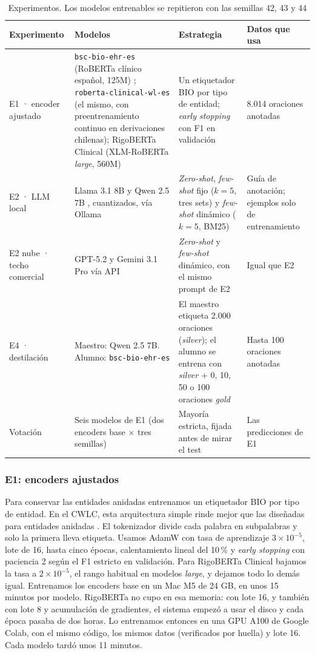 \documentclass[10pt,journal,a4paper]{IEEEtran}
\begin{document}
\begin{table}[!t]
\centering
\caption{Experimentos. Los modelos entrenables se repitieron con las semillas 42, 43 y 44}
\label{tab:diseno}
\begin{tabular}{p{2.1cm}p{5.6cm}p{4.6cm}p{3.6cm}}
\toprule
Experimento & Modelos & Estrategia & Datos que usa \\
\midrule
E1 · encoder ajustado & \texttt{bsc-bio-ehr-es} (RoBERTa clínico español, 125M) \cite{carrino2022}; \texttt{roberta-clinical-wl-es} (el mismo, con preentrenamiento continuo en derivaciones chilenas); RigoBERTa Clinical (XLM-RoBERTa \emph{large}, 560M) \cite{subies2025} & Un etiquetador BIO por tipo de entidad; \emph{early stopping} con F1 en validación & 8.014 oraciones anotadas \\
E2 · LLM local & Llama 3.1 8B \cite{llama3} y Qwen 2.5 7B \cite{qwen25}, cuantizados, vía Ollama & \emph{Zero-shot}, \emph{few-shot} fijo ($k=5$, tres sets) y \emph{few-shot} dinámico ($k=5$, BM25) & Guía de anotación; ejemplos solo de entrenamiento \\
E2 nube · techo comercial & GPT-5.2 \cite{openai2025} y Gemini 3.1 Pro \cite{gemini2026} vía API & \emph{Zero-shot} y \emph{few-shot} dinámico, con el mismo prompt de E2 & Igual que E2 \\
E4 · destilación & Maestro: Qwen 2.5 7B. Alumno: \texttt{bsc-bio-ehr-es} & El maestro etiqueta 2.000 oraciones (\emph{silver}); el alumno se entrena con \emph{silver} + 0, 10, 50 o 100 oraciones \emph{gold} & Hasta 100 oraciones anotadas \\
Votación & Seis modelos de E1 (dos encoders base $\times$ tres semillas) & Mayoría estricta, fijada antes de mirar el test & Las predicciones de E1 \\
\bottomrule
\end{tabular}
\end{table}

\subsubsection{E1: encoders ajustados}
Para conservar las entidades anidadas entrenamos un etiquetador BIO por tipo de entidad. En el CWLC, esta arquitectura simple rinde mejor que las diseñadas para entidades anidadas \cite{rojas2022coling}. El tokenizador divide cada palabra en subpalabras y solo la primera lleva etiqueta. Usamos AdamW con tasa de aprendizaje $3\times10^{-5}$, lote de 16, hasta cinco épocas, calentamiento lineal del 10\,\% y \emph{early stopping} con paciencia 2 según el F1 estricto en validación. Para RigoBERTa Clinical bajamos la tasa a $2\times10^{-5}$, el rango habitual en modelos \emph{large}, y dejamos todo lo demás igual. Entrenamos los encoders base en un Mac M5 de 24 GB, en unos 15 minutos por modelo. RigoBERTa no cupo en esa memoria: con lote 16, y también con lote 8 y acumulación de gradientes, el sistema empezó a usar el disco y cada época pasaba de dos horas. Lo entrenamos entonces en una GPU A100 de Google Colab, con el mismo código, los mismos datos (verificados por huella) y lote 16. Cada modelo tardó unos 11 minutos.
\end{document}
